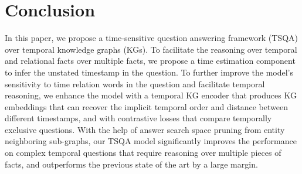 \documentclass[11pt]{article}
\newcommand{\peng}[1]{{{\color{purple!60!blue}{[peng: #1]}}}}
\begin{document}
\begin{comment}


Unicode cannot be used in Bib\TeX{} entries, and some ways of typing special characters can disrupt Bib\TeX's alphabetization. The recommended way of typing special characters is shown in Table~\ref{tab:accents}.

Please ensure that Bib\TeX{} records contain DOIs or URLs when possible, and for all the ACL materials that you reference.
Use the \verb|doi| field for DOIs and the \verb|url| field for URLs.
If a Bib\TeX{} entry has a URL or DOI field, the paper title in the references section will appear as a hyperlink to the paper, using the hyperref \LaTeX{} package.
\end{comment}

\section{Conclusion}
\label{sec:bibtex}

In this paper, we propose a time-sensitive question answering framework (TSQA) over temporal knowledge graphs (KGs). To facilitate the reasoning over temporal and relational facts over multiple facts, we propose a time estimation component to infer the unstated timestamp in the question. To further improve the model's sensitivity to time relation words in the question and facilitate temporal reasoning, we enhance the model with a temporal KG encoder that produces KG embeddings that can recover the implicit temporal order and distance between different timestamps, and with contrastive losses that compare temporally exclusive questions. With the help of answer search space pruning from entity neighboring sub-graphs, our TSQA model significantly improves the performance on complex temporal questions that require reasoning over multiple pieces of facts, and outperforms the previous state of the art by a large margin.

\end{document}
